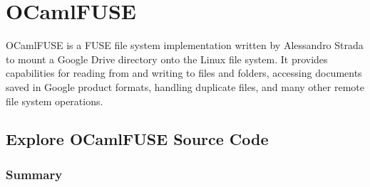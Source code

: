 \chapter{OCamlFUSE}
\label{chp:analysis}
OCamlFUSE is a FUSE file system implementation written by Alessandro Strada to mount a Google Drive directory onto the Linux file system. It provides capabilities for reading from and writing to files and folders, accessing documents saved in Google product formats, handling duplicate files, and many other remote file system operations. \cite{gdriveocamlfuse}
\section{Explore OCamlFUSE Source Code}
\subsection{Summary}
